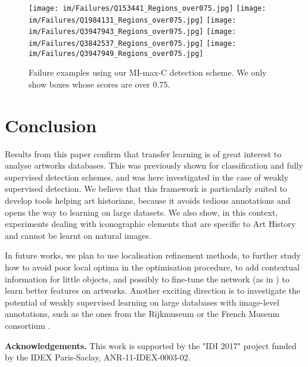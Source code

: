 \documentclass[runningheads]{llncs}
\newcommand\MILSCV{MI-max-C}
\newcommand{\heightimage}{2.55cm}
\begin{document}
\begin{figure}
\centering
  \hfill
     \texttt{[image: im/Failures/Q153441\_Regions\_over075.jpg]} \hfill \texttt{[image: im/Failures/Q1984131\_Regions\_over075.jpg]} \hfill
\texttt{[image: im/Failures/Q3947943\_Regions\_over075.jpg]} \hfill
     \texttt{[image: im/Failures/Q3842537\_Regions\_over075.jpg]} \hfill
    \texttt{[image: im/Failures/Q3947949\_Regions\_over075.jpg]} \hfill
\caption{Failure examples using our \MILSCV{} detection scheme. We only show boxes whose scores are over 0.75.}
    \label{fig:Failures}
\end{figure}





\section{Conclusion}

Results from this paper confirm that transfer learning is of great interest to analyse artworks databases. This was previously shown for classification and fully supervised detection schemes, and was here investigated in the case of weakly supervised detection. We believe that this framework is particularly suited to develop tools helping art historians, because it avoids tedious annotations and opens the way to learning on large datasets. We also show, in this context, experiments dealing with iconographic elements that are specific to Art History and cannot be learnt on natural images. 

In future works, we plan to use localisation refinement methods, to further study how to avoid poor local optima in the optimisation procedure, to add contextual information for little objects, and possibly to fine-tune the network (as in \cite{durand_wildcat_2017}) to learn better features on artworks. Another exciting direction is to investigate the potential of weakly supervised learning on large databases with image-level annotations, such as the ones from the Rijkmuseum \cite{rijksmuseum_online_2018} or the French Museum consortium \cite{rmn_online}.


{\noindent \bf Acknowledgements.}
This work is supported by the "IDI 2017" project funded by the IDEX Paris-Saclay, ANR-11-IDEX-0003-02.

\clearpage



\end{document}
